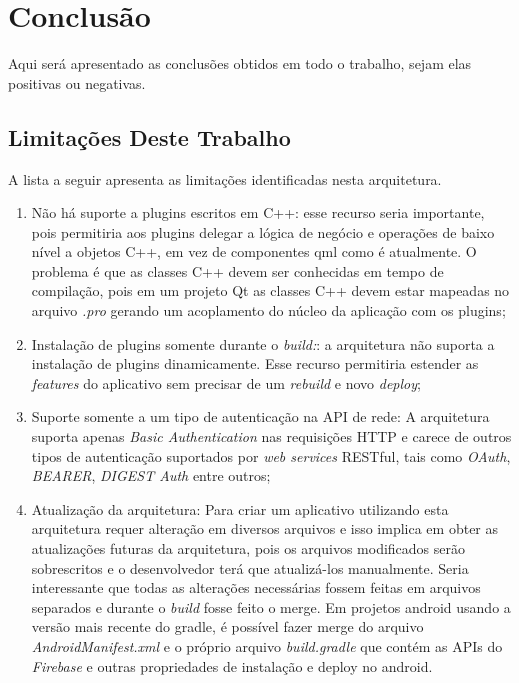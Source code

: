 \section{Conclusão}\label{sec:conclusao}
Aqui será apresentado as conclusões obtidos em todo o trabalho, sejam elas positivas ou negativas.


\subsection{Limitações Deste Trabalho}
A lista a seguir apresenta as limitações identificadas nesta arquitetura.

\begin{enumerate}
	\item Não há suporte a plugins escritos em C++: esse recurso seria importante, pois permitiria aos plugins delegar a lógica de negócio e operações de baixo nível a objetos C++, em vez de componentes qml como é atualmente. O problema é que as classes C++ devem ser conhecidas em tempo de compilação, pois em um projeto Qt as classes C++ devem estar mapeadas no arquivo \textit{.pro} gerando um acoplamento do núcleo da aplicação com os plugins;

	\item Instalação de plugins somente durante o \textit{build:}: a arquitetura não suporta a instalação de plugins dinamicamente. Esse recurso permitiria estender as \textit{features} do aplicativo sem precisar de um \textit{rebuild} e novo \textit{deploy};

	\item Suporte somente a um tipo de autenticação na API de rede: A arquitetura suporta apenas \textit{Basic Authentication} nas requisições HTTP e carece de outros tipos de autenticação suportados por \textit{web services} RESTful, tais como \textit{OAuth}, \textit{BEARER}, \textit{DIGEST Auth} entre outros;

	\item Atualização da arquitetura: Para criar um aplicativo utilizando esta arquitetura requer alteração em diversos arquivos e isso implica em obter as atualizações futuras da arquitetura, pois os arquivos modificados serão sobrescritos e o desenvolvedor terá que atualizá-los manualmente. Seria interessante que todas as alterações necessárias fossem feitas em arquivos separados e durante o \textit{build} fosse feito o merge. Em projetos android usando a versão mais recente do gradle, é possível fazer merge do arquivo \textit{AndroidManifest.xml} e o próprio arquivo \textit{build.gradle} que contém as APIs do \textit{Firebase} e outras propriedades de instalação e deploy no android.
\end{enumerate}


